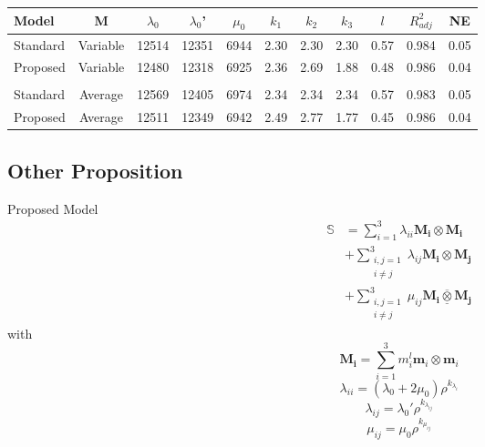 \documentclass[a4paper,fleqn]{DC_ArtStyle}
\begin{document}
	\begin{table}[!h]
		\begin{tabular}{l|c|c|c|c|c|c|c|c|c|c}
			Model & M & $\lambda_0$ & $\lambda_0$' & $\mu_0$ & $k_1$ & $k_2$ & $k_3$ & $l$ & $R^2_{adj}$ & NE \\
			\hline
			Standard & Variable & 12514 & 12351 & 6944 & 2.30 & 2.30 & 2.30 & 0.57 & 0.984 & 0.05 \\
			Proposed & Variable & 12480 & 12318 & 6925 & 2.36 & 2.69 & 1.88 & 0.48 & 0.986 & 0.04\\
			&&&&&&&&&&\\[-0.5em]
			Standard & Average & 12569 & 12405 & 6974 & 2.34 & 2.34 & 2.34 & 0.57 & 0.983 & 0.05 \\
			Proposed & Average & 12511 & 12349 & 6942 & 2.49 & 2.77 & 1.77 & 0.45 & 0.986 & 0.04 \\
			\hline
		\end{tabular}
	\end{table}

	\clearpage
	\subsection{Other Proposition}
	Proposed Model
	\begin{equation}
		\begin{split}
		\mathbb{S} &= \sum_{i=1}^{3} \lambda_{ii} \mathbf{M_i} \otimes \mathbf{M_i}\\
					&+ \sum_{\substack{i,j=1\\i\neq j}}^{3} \lambda_{ij} \mathbf{M_i} \otimes \mathbf{M_j}\\
					&+ \sum_{\substack{i,j=1\\i\neq j}}^{3} \mu_{ij} \mathbf{M_i} \underline{\overline{\otimes}}  \mathbf{M_j}
		\end{split}
	\end{equation}
	with
	\begin{equation}
		\mathbf{M_i} = \sum_{i=1}^{3} m_i^l \mathbf{m}_i \otimes \mathbf{m}_i
	\end{equation}
	\begin{equation}
		\lambda_{ii} = (\lambda_0 + 2\mu_0) \rho^{k_{\lambda_i}}
	\end{equation}
	\begin{equation}
		\lambda_{ij} = \lambda_0' \rho^{k_{\lambda_{ij}}}
	\end{equation}
	\begin{equation}
		\mu_{ij} = \mu_0 \rho^{k_{\mu_{ij}}}
	\end{equation}
\end{document}
